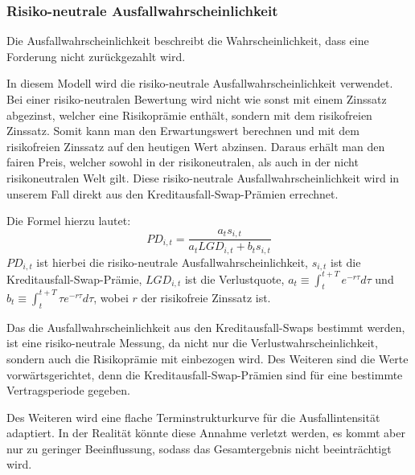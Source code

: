 \documentclass[a4paper,12pt]{scrartcl}
\begin{document}
\subsubsection{Risiko-neutrale Ausfallwahrscheinlichkeit}
Die Ausfallwahrscheinlichkeit beschreibt die Wahrscheinlichkeit, dass eine Forderung nicht zurückgezahlt wird.

In diesem Modell wird die risiko-neutrale Ausfallwahrscheinlichkeit verwendet. Bei einer risiko-neutralen Bewertung wird nicht wie sonst mit einem Zinssatz abgezinst, welcher eine Risikoprämie enthält, sondern mit dem risikofreien Zinssatz. Somit kann man den Erwartungswert berechnen und mit dem risikofreien Zinssatz auf den heutigen Wert abzinsen. Daraus erhält man den fairen Preis, welcher sowohl in der risikoneutralen, als auch in der nicht risikoneutralen Welt gilt.
Diese risiko-neutrale Ausfallwahrscheinlichkeit wird in unserem Fall direkt aus den Kreditausfall-Swap-Prämien errechnet. 

Die Formel hierzu lautet: 
\begin{equation}
PD_{i,t}=\frac{a_t s_{i,t}}{a_t LGD_{i,t}+b_t s_{i,t}}
\end{equation}
$PD_{i,t}$ ist hierbei die risiko-neutrale Ausfallwahrscheinlichkeit, $s_{i,t}$ ist die Kreditausfall-Swap-Prämie, $LGD_{i,t}$ ist die Verlustquote, $a_t \equiv \int_{t}^{t+T} e^{-r \tau}d \tau$ und $b_t \equiv \int_{t}^{t+T} \tau e^{-r \tau}d \tau$, wobei $r$ der risikofreie Zinssatz ist.

Das die Ausfallwahrscheinlichkeit aus den Kreditausfall-Swaps bestimmt werden, ist eine risiko-neutrale Messung, da nicht nur die Verlustwahrscheinlichkeit, sondern auch die Risikoprämie mit einbezogen wird. Des Weiteren sind die Werte vorwärtsgerichtet, denn die Kreditausfall-Swap-Prämien sind für eine bestimmte Vertragsperiode gegeben. 

Des Weiteren wird eine flache Terminstrukturkurve für die Ausfallintensität adaptiert. In der Realität könnte diese Annahme verletzt werden, es kommt aber nur zu geringer Beeinflussung, sodass das Gesamtergebnis nicht beeinträchtigt wird.
\newpage
\end{document}
